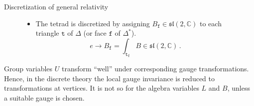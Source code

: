 \documentclass[12pt,titlepage]{article}
\begin{document}
\begin{frame}{Discretization of general relativity}
\begin{figure}[!ht]
\begin{minipage}{0.5\linewidth}
{\begin{itemize}
\begin{equation}
                \end{equation}
                \item<2-> The tetrad is discretized by assigning $B_\mathtt{f}\in\mathfrak{sl}(2,\mathbb{C})$ to each triangle $\mathtt{t}$ of $\Delta$ (or face $\mathtt{f}$ of $\Delta^\text{*}$).
                \begin{equation}
                    e\to B_\mathtt{f}=\int_\mathtt{t_f} B\in\mathfrak{sl}(2,\mathbb{C})\,.
                \end{equation}
            \end{itemize}}
        \end{minipage}
    \end{figure}\FloatBarrier
    \begin{list}{\,}{\leftmargin=1em \itemindent=0em}
        \item<3-> Group variables $U$ transform ``well'' under corresponding gauge transformations. Hence, in the discrete theory the local gauge invariance is reduced to transformations at vertices. It is not so for the algebra variables $L$ and $B$, unless a suitable gauge is chosen.
    \end{list}
\end{frame}
\end{document}
